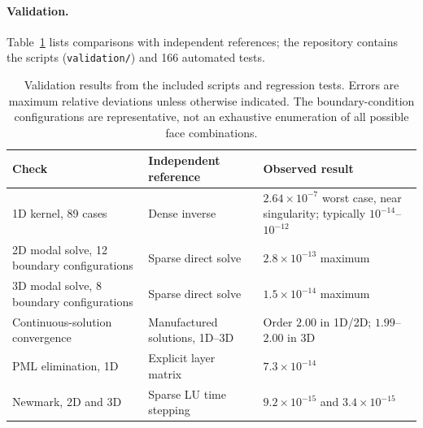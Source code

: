 \documentclass[preprint,12pt,a4paper]{elsarticle}
\begin{document}
\paragraph{Validation.}
Table~\ref{tab:valid} lists comparisons with independent references; the repository contains the scripts (\texttt{validation/}) and 166 automated tests.
\begin{table}[t]
\centering\small
\begin{tabular}{@{}p{5.0cm}p{3.5cm}p{3.5cm}@{}}
\toprule
Check & Independent reference & Observed result\\
\midrule
1D kernel, 89 cases & Dense inverse & $2.64\times10^{-7}$ worst case, near singularity; typically $10^{-14}$--$10^{-12}$\\
2D modal solve, 12 boundary configurations & Sparse direct solve & $2.8\times10^{-13}$ maximum\\
3D modal solve, 8 boundary configurations & Sparse direct solve & $1.5\times10^{-14}$ maximum\\
Continuous-solution convergence & Manufactured solutions, 1D--3D & Order $2.00$ in 1D/2D; $1.99$--$2.00$ in 3D\\
PML elimination, 1D & Explicit layer matrix & $7.3\times10^{-14}$\\
Newmark, 2D and 3D & Sparse LU time stepping & $9.2\times10^{-15}$ and $3.4\times10^{-15}$\\
\bottomrule
\end{tabular}
\caption{Validation results from the included scripts and regression tests. Errors are maximum relative deviations unless otherwise indicated. The boundary-condition configurations are representative, not an exhaustive enumeration of all possible face combinations.}
\label{tab:valid}
\end{table}
\end{document}
